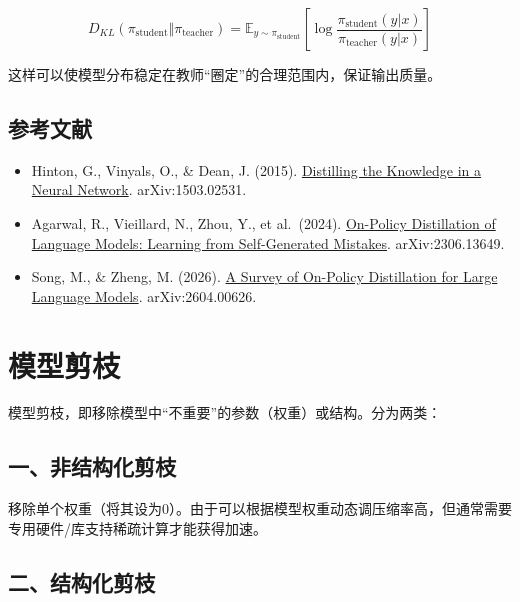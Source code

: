 \[
D_{KL}(\pi_{\mathrm{student}} \Vert \pi_{\mathrm{teacher}}) = \mathbb{E}_{y \sim \pi_{\mathrm{student}}}\left[\log \frac{\pi_{\mathrm{student}}(y|x)}{\pi_{\mathrm{teacher}}(y|x)}\right]
\]

这样可以使模型分布稳定在教师``圈定''的合理范围内，保证输出质量。

\hypertarget{ux53c2ux8003ux6587ux732e-87}{%
\subsection{参考文献}\label{ux53c2ux8003ux6587ux732e-87}}

\begin{itemize}
\tightlist
\item
  Hinton, G., Vinyals, O., \& Dean, J. (2015). \href{https://arxiv.org/abs/1503.02531}{Distilling the Knowledge in a Neural Network}. arXiv:1503.02531.
\item
  Agarwal, R., Vieillard, N., Zhou, Y., et al.~(2024). \href{https://arxiv.org/abs/2306.13649}{On-Policy Distillation of Language Models: Learning from Self-Generated Mistakes}. arXiv:2306.13649.
\item
  Song, M., \& Zheng, M. (2026). \href{https://arxiv.org/abs/2604.00626}{A Survey of On-Policy Distillation for Large Language Models}. arXiv:2604.00626.
\end{itemize}

\clearpage

\hypertarget{ux6a21ux578bux526aux679d}{%
\section{模型剪枝}\label{ux6a21ux578bux526aux679d}}

模型剪枝，即移除模型中``不重要''的参数（权重）或结构。分为两类：

\hypertarget{ux4e00ux975eux7ed3ux6784ux5316ux526aux679d}{%
\subsection{一、非结构化剪枝}\label{ux4e00ux975eux7ed3ux6784ux5316ux526aux679d}}

移除单个权重（将其设为0）。由于可以根据模型权重动态调压缩率高，但通常需要专用硬件/库支持稀疏计算才能获得加速。

\hypertarget{ux4e8cux7ed3ux6784ux5316ux526aux679d}{%
\subsection{二、结构化剪枝}\label{ux4e8cux7ed3ux6784ux5316ux526aux679d}}

